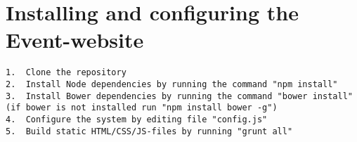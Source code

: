 \section{Installing and configuring the Event-website}
\begin{verbatim}
1.	Clone the repository
2.	Install Node dependencies by running the command "npm install"
3.	Install Bower dependencies by running the command "bower install" 
(if bower is not installed run "npm install bower -g")
4.	Configure the system by editing file "config.js"
5.	Build static HTML/CSS/JS-files by running "grunt all"

\end{verbatim}

